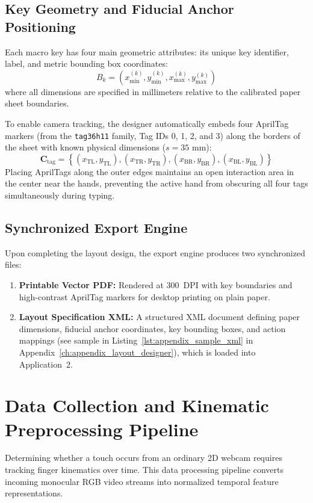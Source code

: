 \subsection{Key Geometry and Fiducial Anchor Positioning}
\label{subsec:meth_key_geometry}
Each macro key has four main geometric attributes: its unique key identifier, label, and metric bounding box coordinates:
\begin{equation}
B_k = \left( x_{\min}^{(k)}, y_{\min}^{(k)}, x_{\max}^{(k)}, y_{\max}^{(k)} \right)
\label{eq:meth_key_box}
\end{equation}
where all dimensions are specified in millimeters relative to the calibrated paper sheet boundaries.

To enable camera tracking, the designer automatically embeds four AprilTag markers (from the \texttt{tag36h11} family, Tag IDs 0, 1, 2, and 3) along the borders of the sheet with known physical dimensions ($s = 35\text{ mm}$):
\begin{equation}
\mathbf{C}_{\text{tag}} = \left\{ (x_{\text{TL}}, y_{\text{TL}}), (x_{\text{TR}}, y_{\text{TR}}), (x_{\text{BR}}, y_{\text{BR}}), (x_{\text{BL}}, y_{\text{BL}}) \right\}
\label{eq:meth_tag_coords}
\end{equation}
Placing AprilTags along the outer edges maintains an open interaction area in the center near the hands, preventing the active hand from obscuring all four tags simultaneously during typing.

\subsection{Synchronized Export Engine}
\label{subsec:meth_export_engine}
Upon completing the layout design, the export engine produces two synchronized files:
\begin{enumerate}
    \item \textbf{Printable Vector PDF:} Rendered at 300~DPI with key boundaries and high-contrast AprilTag markers for desktop printing on plain paper.
    \item \textbf{Layout Specification XML:} A structured XML document defining paper dimensions, fiducial anchor coordinates, key bounding boxes, and action mappings (see sample in Listing~\ref{lst:appendix_sample_xml} in Appendix~\ref{ch:appendix_layout_designer}), which is loaded into Application~2.
\end{enumerate}

\section{Data Collection and Kinematic Preprocessing Pipeline}
\label{sec:meth_data_pipeline}
Determining whether a touch occurs from an ordinary 2D webcam requires tracking finger kinematics over time. This data processing pipeline converts incoming monocular RGB video streams into normalized temporal feature representations.

